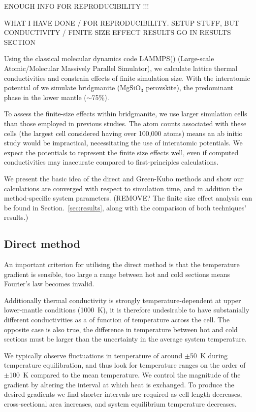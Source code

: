 \documentclass[%
preprint,                                  %
nofootinbib,
 amsmath,amssymb,
 aps,
]{revtex4-1}
\begin{document}
ENOUGH INFO FOR REPRODUCIBILITY !!!

WHAT I HAVE DONE / FOR REPRODUCIBILITY. SETUP STUFF, BUT CONDUCTIVITY / FINITE SIZE EFFECT RESULTS GO IN RESULTS SECTION

Using the classical molecular dynamics code LAMMPS(\citet{Plimpton1995}) (Large-scale Atomic/Molecular Massively Parallel Simulator), we calculate lattice thermal conductivities and constrain effects of finite simulation size. With the interatomic potential of \citet{Oganov2000} we simulate bridgmanite (MgSiO$_3$ perovskite), the predominant phase in the lower mantle ($\sim$75\%). 

To assess the finite-size effects within bridgmanite, we use larger simulation cells than those employed in previous studies. The atom counts associated with these cells (the largest cell considered having over 100,000 atoms) means an ab initio study would be impractical, necessitating the use of interatomic potentials. We expect the potentials to represent the finite size effects well, even if computed conductivities may inaccurate compared to first-principles calculations. 

We present the basic idea of the direct and Green-Kubo methods and show our calculations are converged with respect to simulation time, and in addition the method-specific system parameters. (REMOVE? The finite size effect analysis can be found in Section.~\ref{sec:results}, along with the comparison of both techniques' results.)




\subsection{\label{sec:method.direct}Direct method}

An important criterion for utilising the direct method is that the temperature gradient is sensible, too large a range between hot and cold sections means Fourier's law becomes invalid. 

Additionally thermal conductivity is strongly temperature-dependent at upper lower-mantle conditions (1000~K), it is therefore undesirable to have substanially different conductivities as a of function of temperature across the cell. The opposite case is also true, the difference in temperature between hot and cold sections must be larger than the uncertainty in the average system temperature. 

We typically observe fluctuations in temperature of around $\pm$50~K during temperature equilibration, and thus look for temperature ranges on the order of $\pm$100~K compared to the mean temperature. We control the magnitude of the gradient by altering the interval at which heat is exchanged. To produce the desired gradients we find shorter intervals are required as cell length decreases, cross-sectional area increases, and system equilibrium temperature decreases. 
\end{document}
